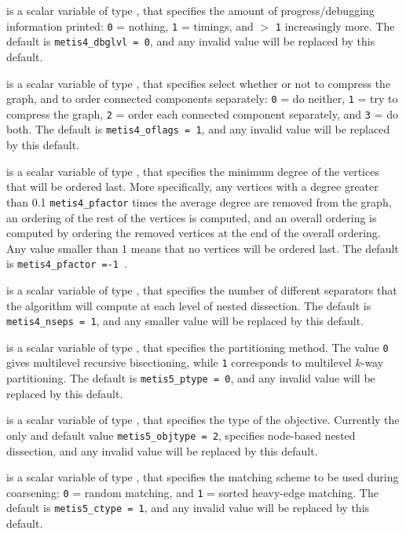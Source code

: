 \documentclass{galahad}
\begin{document}
\begin{description}
 is a scalar variable of type \integer, that specifies
the amount of progress/debugging information printed: 
{\tt 0} = nothing, {\tt 1} = timings, and $>$ {\tt 1} increasingly more.
The default is {\tt metis4\_dbglvl = 0}, and any invalid value will be
replaced by this default.

 is a scalar variable of type \integer, that specifies
select whether or not to compress the graph, and to order connected 
 components separately: {\tt 0} = do neither, 
 {\tt 1} = try to compress the graph, 
 {\tt 2} = order each connected component separately, and {\tt 3} = do both.
The default is {\tt metis4\_oflags = 1}, and any invalid value will be
replaced by this default.

 is a scalar variable of type \integer, that specifies
the minimum degree of the vertices that will be ordered last. 
More specifically, any vertices with a degree greater than 
0.1 {\tt metis4\_pfactor} times the average degree are removed from
the graph, an ordering of the rest of the vertices is computed, and an
overall ordering is computed by ordering the removed vertices at the end
of the overall ordering. Any value
smaller than 1 means that no vertices will be ordered last.
The default is {\tt metis4\_pfactor =-1 }.

 is a scalar variable of type \integer, that specifies
the number of different separators that the algorithm will compute
at each level of nested dissection.
The default is {\tt metis4\_nseps = 1}, and any smaller value
will be replaced by this default.

 is a scalar variable of type \integer, that specifies
the partitioning method. The value {\tt 0} gives multilevel recursive 
bisectioning, while {\tt 1} corresponds to multilevel $k$-way partitioning.
The default is {\tt metis5\_ptype = 0}, and any invalid value will be
replaced by this default.

 is a scalar variable of type \integer, that specifies
the type of the objective. Currently the only and default value
{\tt metis5\_objtype = 2}, specifies node-based nested dissection, 
and any invalid value will be replaced by this default.

 is a scalar variable of type \integer, that specifies
the matching scheme to be used during coarsening: {\tt 0} = random matching, 
 and {\tt 1} = sorted heavy-edge matching.
The default is {\tt metis5\_ctype = 1}, and any invalid value will be
replaced by this default.


\end{description}
\end{document}
